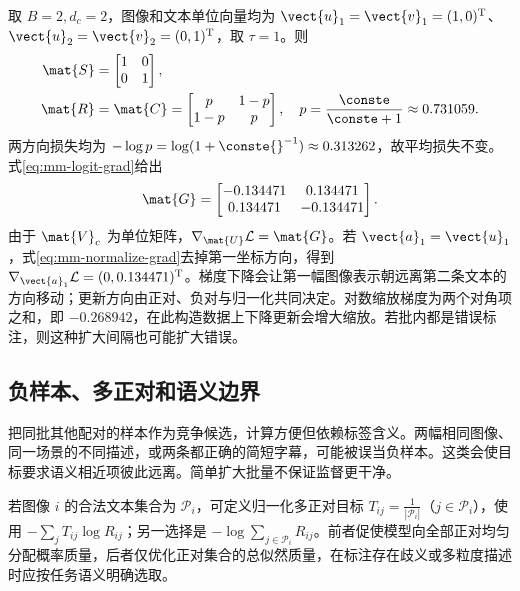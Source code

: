 \documentclass[../textbook.tex]{subfiles}
\begin{document}
\begin{example}[两个样本的对比损失]

取 $B=2,d_c=2$，图像和文本单位向量均为 $\vect{u}_1=\vect{v}_1=(1,0)^{\mathrm{T}}$、$\vect{u}_2=\vect{v}_2=(0,1)^{\mathrm{T}}$，取 $\tau=1$。则
\begin{align*}
 \mat{S} &= \begin{bmatrix}1&0\\0&1\end{bmatrix}, \\
 \mat{R} &= \mat{C}=\begin{bmatrix}p&1-p\\1-p&p\end{bmatrix},\quad
 p=\frac{\conste}{\conste+1}\approx0.731059.
\end{align*}
两方向损失均为 $-\log p=\log(1+\conste{}^{-1})\approx0.313262$，故平均损失不变。式\ref{eq:mm-logit-grad}给出
\begin{equation*}
 \mat{G}=\begin{bmatrix}-0.134471&0.134471\\0.134471&-0.134471\end{bmatrix}.
\end{equation*}
由于 $\mat{V}_c$ 为单位矩阵，$\nabla_{\mat{U}}\mathcal L=\mat{G}$。若 $\vect{a}_1=\vect{u}_1$，式\ref{eq:mm-normalize-grad}去掉第一坐标方向，得到 $\nabla_{\vect{a}_1}\mathcal L=(0,0.134471)^{\mathrm{T}}$。梯度下降会让第一幅图像表示朝远离第二条文本的方向移动；更新方向由正对、负对与归一化共同决定。对数缩放梯度为两个对角项之和，即 $-0.268942$，在此构造数据上下降更新会增大缩放。若批内都是错误标注，则这种扩大间隔也可能扩大错误。
\end{example}

\subsection{负样本、多正对和语义边界}
把同批其他配对的样本作为竞争候选，计算方便但依赖标签含义。两幅相同图像、同一场景的不同描述，或两条都正确的简短字幕，可能被误当负样本。这类会使目标要求语义相近项彼此远离。简单扩大批量不保证监督更干净。

若图像 $i$ 的合法文本集合为 $\mathcal P_i$，可定义归一化多正对目标 $T_{ij}=\frac{1}{|\mathcal P_i|}$（$j\in\mathcal P_i$），使用 $-\sum_jT_{ij}\log R_{ij}$；另一选择是 $-\log\sum_{j\in\mathcal P_i}R_{ij}$。前者促使模型向全部正对均匀分配概率质量，后者仅优化正对集合的总似然质量，在标注存在歧义或多粒度描述时应按任务语义明确选取。
\end{document}
